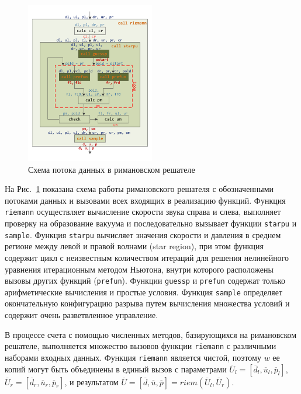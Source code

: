 \begin{figure}[ht]
\centering
\includegraphics[width=0.5\textwidth]{fig/vec_riemann_functions.pdf}
\singlespacing
{}\caption{Схема потока данных в римановском решателе}
\label{fig:text_4_vec_riem_functions}
\end{figure}

На Рис.~\ref{fig:text_4_vec_riem_functions} показана схема работы римановского решателя с обозначенными потоками данных и вызовами всех входящих в реализацию функций.
Функция \texttt{riemann} осуществляет вычисление скорости звука справа и слева, выполняет проверку на образование вакуума и последовательно вызывает функции \texttt{starpu} и \texttt{sample}.
Функция \texttt{starpu} вычисляет значения скорости и давления в среднем регионе между левой и правой волнами (star region), при этом функция содержит цикл с неизвестным количеством итераций для решения нелинейного уравнения итерационным методом Ньютона, внутри которого расположены вызовы других функций (\texttt{prefun}).
Функции \texttt{guessp} и \texttt{prefun} содержат только арифметические вычисления и простые условия.
Функция \texttt{sample} определяет окончательную конфигурацию разрыва путем вычисления множества условий и содержит очень разветвленное управление.

В процессе счета с помощью численных методов, базирующихся на римановском решателе, выполняется множество вызовов функции \texttt{riemann} с различными наборами входных данных.
Функция \texttt{riemann} является чистой, поэтому $w$ ее копий могут быть объединены в единый вызов с параметрами $\overline{U}_l = [\overline{d}_l, \overline{u}_l, \overline{p}_l]$, $\overline{U}_r = [\overline{d}_r, \overline{u}_r, \overline{p}_r]$, и результатом $\overline{U} = [\overline{d}, \overline{u}, \overline{p}] = riem(\overline{U}_l, \overline{U}_r)$.

